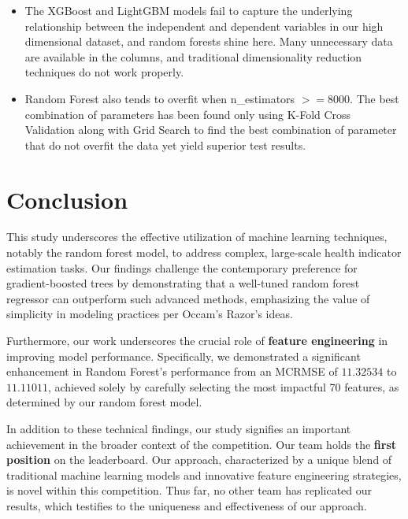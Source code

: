 \documentclass{article}
\begin{document}
\begin{itemize}
    \item The XGBoost and LightGBM models fail to capture the underlying relationship between the independent and dependent variables in our high dimensional dataset, and random forests shine here. Many unnecessary data are available in the columns, and traditional dimensionality reduction techniques do not work properly.

    \item Random Forest also tends to overfit when n\_estimators $>= 8000$. The best combination of parameters has been found only using K-Fold Cross Validation along with Grid Search to find the best combination of parameter that do not overfit the data yet yield superior test results.
\end{itemize}



\section{Conclusion}
This study underscores the effective utilization of machine learning techniques, notably the random forest model, to address complex, large-scale health indicator estimation tasks. Our findings challenge the contemporary preference for gradient-boosted trees by demonstrating that a well-tuned random forest regressor can outperform such advanced methods, emphasizing the value of simplicity in modeling practices per Occam's Razor's ideas.

Furthermore, our work underscores the crucial role of \textbf{feature engineering} in improving model performance. Specifically, we demonstrated a significant enhancement in Random Forest's performance from an MCRMSE of $11.32534$ to $11.11011$, achieved solely by carefully selecting the most impactful 70 features, as determined by our random forest model.

In addition to these technical findings, our study signifies an important achievement in the broader context of the competition. Our team holds the \textbf{first position} on the leaderboard. Our approach, characterized by a unique blend of traditional machine learning models and innovative feature engineering strategies, is novel within this competition. Thus far, no other team has replicated our results, which testifies to the uniqueness and effectiveness of our approach.
\end{document}
